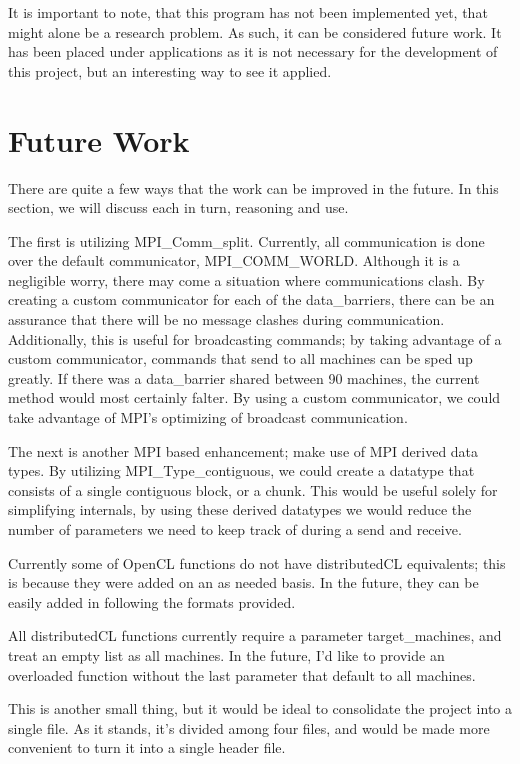 \documentclass[../thesis.tex]{subfiles}
\begin{document}
    It is important to note, that this program has not been implemented yet, that might alone be a research problem. As such, it can be considered future work. It has been placed under applications as it is not necessary for the development of this project, but an interesting way to see it applied.

\section{Future Work}

There are quite a few ways that the work can be improved in the future. In this section, we will discuss each in turn, reasoning and use.

The first is utilizing MPI\_Comm\_split. Currently, all communication is done over the default communicator, MPI\_COMM\_WORLD. Although it is a negligible worry, there may come a situation where communications clash. By creating a custom communicator for each of the data\_barriers, there can be an assurance that there will be no message clashes during communication. Additionally, this is useful for broadcasting commands; by taking advantage of a custom communicator, commands that send to all machines can be sped up greatly. If there was a data\_barrier shared between 90 machines, the current method would most certainly falter. By using a custom communicator, we could take advantage of MPI's optimizing of broadcast communication.

The next is another MPI based enhancement; make use of MPI derived data types. By utilizing MPI\_Type\_contiguous, we could create a datatype that consists of a single contiguous block, or a chunk. This would be useful solely for simplifying internals, by using these derived datatypes we would reduce the number of parameters we need to keep track of during a send and receive.

Currently some of OpenCL functions do not have distributedCL equivalents; this is because they were added on an as needed basis. In the future, they can be easily added in following the formats provided.

All distributedCL functions currently require a parameter target\_machines, and treat an empty list as all machines. In the future, I'd like to provide an overloaded function without the last parameter that default to all machines.

This is another small thing, but it would be ideal to consolidate the project into a single file. As it stands, it's divided among four files, and would be made more convenient to turn it into a single header file.
\end{document}
